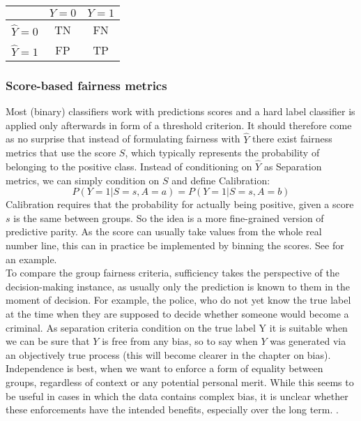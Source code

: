 \begin{center}
    \renewcommand{\arraystretch}{1.5}  %
    \begin{tabular}{c|c|c|}
        \hline
        & \(Y = 0\) & \(Y = 1\) \\
        \hline
        \(\hat{Y} = 0\) & TN & FN \\
        \hline
        \(\hat{Y} = 1\) & FP & TP \\
    \end{tabular}
    \label{tab:confusion_matrix}
\end{center}

\subsubsection*{Score-based fairness metrics}
Most (binary) classifiers work with predictions scores and a hard label classifier is applied only afterwards in form of a threshold criterion. It should therefore come as no surprise that instead of formulating fairness with $\hat{Y}$ there exist fairness metrics that use the score $S$, which typically represents the probability of belonging to the positive class. Instead of conditioning on $\hat{Y}$ as Separation metrics, we can simply condition on $S$ and define Calibration:
$$P(Y = 1 | S = s, A = a) = P(Y = 1 | S = s, A = b)$$
Calibration requires that the probability for actually being positive, given a score $s$ is the same between groups. So the idea is a more fine-grained version of predictive parity. As the score can usually take values from the whole real number line, this can in practice be implemented by binning the scores. See \cite{verma2018} for an example.\\

To compare the group fairness criteria, sufficiency takes the perspective of the decision-making instance, as usually only the prediction is known to them in the moment of decision. For example, the police, who do not yet know the true label at the time when they are supposed to decide whether someone would become a criminal.
As separation criteria condition on the true label Y it is suitable when we can be sure that $Y$ is free from any bias, so to say when $Y$ was generated via an objectively true process (this will become clearer in the chapter on bias).
Independence is best, when we want to enforce a form of equality between groups, regardless of context or any potential personal merit. While this seems to be useful in cases in which the data contains complex bias, it is unclear whether these enforcements have the intended benefits, especially over the long term. {\color{red}{Reference?}}.

